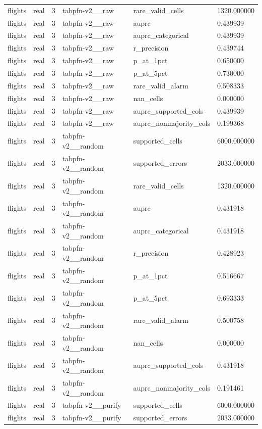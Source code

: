 \begin{tabular}{llllll}
flights & real & 3 & tabpfn-v2\_\_raw & rare\_valid\_cells & 1320.000000 \\
flights & real & 3 & tabpfn-v2\_\_raw & auprc & 0.439939 \\
flights & real & 3 & tabpfn-v2\_\_raw & auprc\_categorical & 0.439939 \\
flights & real & 3 & tabpfn-v2\_\_raw & r\_precision & 0.439744 \\
flights & real & 3 & tabpfn-v2\_\_raw & p\_at\_1pct & 0.650000 \\
flights & real & 3 & tabpfn-v2\_\_raw & p\_at\_5pct & 0.730000 \\
flights & real & 3 & tabpfn-v2\_\_raw & rare\_valid\_alarm & 0.508333 \\
flights & real & 3 & tabpfn-v2\_\_raw & nan\_cells & 0.000000 \\
flights & real & 3 & tabpfn-v2\_\_raw & auprc\_supported\_cols & 0.439939 \\
flights & real & 3 & tabpfn-v2\_\_raw & auprc\_nonmajority\_cols & 0.199368 \\
flights & real & 3 & tabpfn-v2\_\_random & supported\_cells & 6000.000000 \\
flights & real & 3 & tabpfn-v2\_\_random & supported\_errors & 2033.000000 \\
flights & real & 3 & tabpfn-v2\_\_random & rare\_valid\_cells & 1320.000000 \\
flights & real & 3 & tabpfn-v2\_\_random & auprc & 0.431918 \\
flights & real & 3 & tabpfn-v2\_\_random & auprc\_categorical & 0.431918 \\
flights & real & 3 & tabpfn-v2\_\_random & r\_precision & 0.428923 \\
flights & real & 3 & tabpfn-v2\_\_random & p\_at\_1pct & 0.516667 \\
flights & real & 3 & tabpfn-v2\_\_random & p\_at\_5pct & 0.693333 \\
flights & real & 3 & tabpfn-v2\_\_random & rare\_valid\_alarm & 0.500758 \\
flights & real & 3 & tabpfn-v2\_\_random & nan\_cells & 0.000000 \\
flights & real & 3 & tabpfn-v2\_\_random & auprc\_supported\_cols & 0.431918 \\
flights & real & 3 & tabpfn-v2\_\_random & auprc\_nonmajority\_cols & 0.191461 \\
flights & real & 3 & tabpfn-v2\_\_purify & supported\_cells & 6000.000000 \\
flights & real & 3 & tabpfn-v2\_\_purify & supported\_errors & 2033.000000 \\

\end{tabular}
